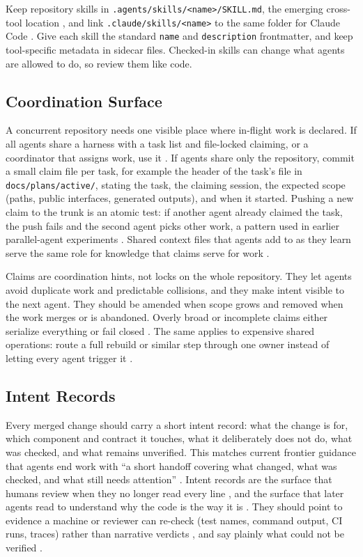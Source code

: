 \documentclass[11pt]{article}
\begin{document}
Keep repository skills in \texttt{.agents/skills/<name>/SKILL.md}, the emerging cross-tool location \cite{agentskills2026clients,openai2026codexskills}, and link \texttt{.claude/skills/<name>} to the same folder for Claude Code \cite{anthropic2026skills}. Give each skill the standard \texttt{name} and \texttt{description} frontmatter, and keep tool-specific metadata in sidecar files. Checked-in skills can change what agents are allowed to do, so review them like code.

\subsection{Coordination Surface}
A concurrent repository needs one visible place where in-flight work is declared. If all agents share a harness with a task list and file-locked claiming, or a coordinator that assigns work, use it \cite{anthropic2026agentteams,cursor2026projects,openai2026agentsapi}. If agents share only the repository, commit a small claim file per task, for example the header of the task's file in \texttt{docs/plans/active/}, stating the task, the claiming session, the expected scope (paths, public interfaces, generated outputs), and when it started. Pushing a new claim to the trunk is an atomic test: if another agent already claimed the task, the push fails and the second agent picks other work, a pattern used in earlier parallel-agent experiments \cite{carlini2026compiler}. Shared context files that agents add to as they learn serve the same role for knowledge that claims serve for work \cite{cursor2026projects}.

Claims are coordination hints, not locks on the whole repository. They let agents avoid duplicate work and predictable collisions, and they make intent visible to the next agent. They should be amended when scope grows and removed when the work merges or is abandoned. Overly broad or incomplete claims either serialize everything or fail closed \cite{nikolaev2026claimplane}. The same applies to expensive shared operations: route a full rebuild or similar step through one owner instead of letting every agent trigger it \cite{anthropic2026migrations}.

\subsection{Intent Records}
Every merged change should carry a short intent record: what the change is for, which component and contract it touches, what it deliberately does not do, what was checked, and what remains unverified. This matches current frontier guidance that agents end work with ``a short handoff covering what changed, what was checked, and what still needs attention'' \cite{openai2026gpt6guide}. Intent records are the surface that humans review when they no longer read every line \cite{anthropic2026scion}, and the surface that later agents read to understand why the code is the way it is \cite{lewi2026runme}. They should point to evidence a machine or reviewer can re-check (test names, command output, CI runs, traces) rather than narrative verdicts \cite{utture2026prmerge,custer2026verifier}, and say plainly what could not be verified \cite{aiello2026daybreak,martin2026automations}.
\end{document}
